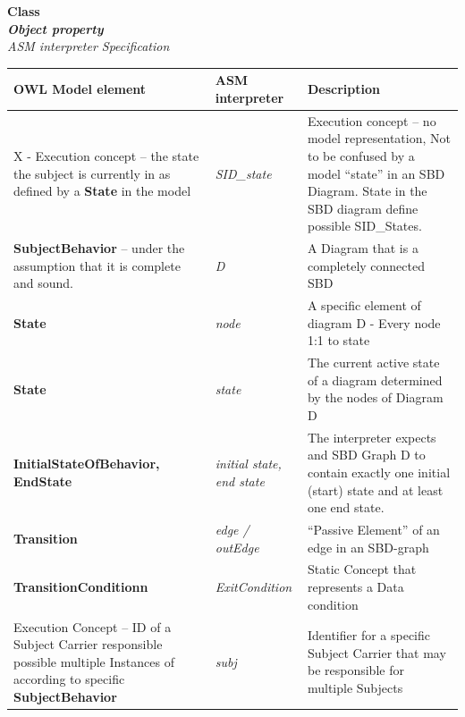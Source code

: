 \textbf{Class}\\
\textbf{\emph{Object property}}\\
\textit{ASM interpreter Specification}\\


\begin{landscape}
	\begin {longtable} {| p{} | p{} | p{}|}
	\hline
	OWL Model element &   ASM interpreter & Description\\
	\toprule
	\endhead
	\hline
	
	X - Execution concept – the state the subject is currently in as defined by a \textbf{State} in the model & \textit{SID\_state} &  Execution concept – no model representation, Not to be confused by a model “state” in an SBD Diagram. State in the SBD diagram define possible SID\_States.
	\\
	\hline
	
	\textbf{SubjectBehavior }	– under the assumption that it is complete and sound.
	& \textit{D} 
	&  A Diagram that is a completely connected SBD
	\\
	\hline
	
	\textbf{State}
	& \textit{node} 
	&  A specific element of diagram D -	Every node 1:1 to state
	\\
	\hline
	
	\textbf{State}
	& \textit{state} 
	& The current active state of a diagram determined by the nodes of Diagram D
	\\
	\hline
	
	\textbf{InitialStateOfBehavior, \newline EndState }
	& \textit{initial state, \newline end state} 
	& The interpreter expects and SBD Graph D to contain exactly one initial (start) state and at least one end state.
	\\
	\hline
	
	\textbf{Transition}
	& \textit{edge / outEdge} 
	& “Passive Element” of an edge in an SBD-graph
	\\
	\hline
	
	\textbf{TransitionConditionn}
	& \textit{ExitCondition} 
	& Static Concept that represents a Data condition
	\\
	\hline
	
	Execution Concept – ID of a Subject Carrier responsible possible multiple Instances of according to specific  \textbf{SubjectBehavior}
	& \textit{subj} 
	& Identifier for a specific Subject Carrier that may be responsible for multiple Subjects
	\\
	\hline
	

\end{longtable}
\end{landscape}

